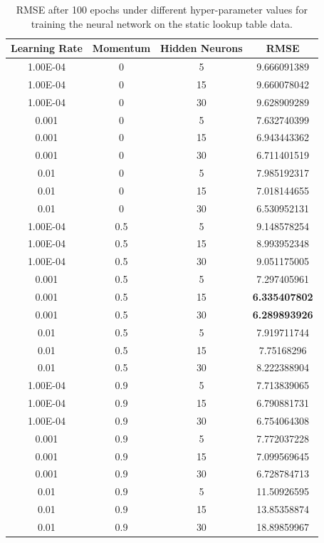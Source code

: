 \documentclass[a4paper,12pt]{article}
\begin{document}
\begin{table}[hbt!]
\centering
\begin{tabular}{c|c|c|c}
Learning Rate &  Momentum &  Hidden Neurons & RMSE\\
\hline
1.00E-04 &0 & 5 & 9.666091389\\
1.00E-04& 0 &  15 &  9.660078042\\
1.00E-04 &  0 &  30 & 9.628909289\\
0.001 &  0 &  5 &  7.632740399\\
0.001 &  0 &  15 &  6.943443362\\
0.001 &  0 &  30 &  6.711401519\\
0.01 &  0 &  5 &  7.985192317\\
0.01 &  0 &  15 &  7.018144655\\
0.01 &  0 &  30 &  6.530952131\\
1.00E-04 &  0.5 &  5 &  9.148578254\\
1.00E-04 &  0.5 &  15 &  8.993952348\\
1.00E-04 &  0.5 &  30 &  9.051175005\\
0.001 &  0.5 &  5 & 7.297405961\\
0.001 &  0.5 &  15 &  \textbf{6.335407802}\\
0.001 &  0.5 &  30 &  \textbf{6.289893926}\\
0.01 &  0.5 &  5 &  7.919711744\\
0.01 &  0.5 &  15 & 7.75168296\\
0.01 &  0.5 &  30 &  8.222388904\\
1.00E-04 &  0.9 &  5 &  7.713839065\\
1.00E-04 &  0.9 &  15 & 6.790881731\\
1.00E-04 &  0.9 &  30 & 6.754064308\\
0.001 &  0.9 &  5 &  7.772037228\\
0.001 &  0.9 &  15 &  7.099569645\\
0.001 &  0.9 &  30 &  6.728784713\\
0.01 &  0.9 &  5 &    11.50926595\\
0.01 &  0.9 &  15 &  13.85358874\\
0.01 &  0.9 &  30 &  18.89859967\\

\end{tabular}
\caption{RMSE after 100 epochs under different hyper-parameter values for training the neural network on the static lookup table data.}
\label{tbl:grid_search}
\end{table}
\end{document}
